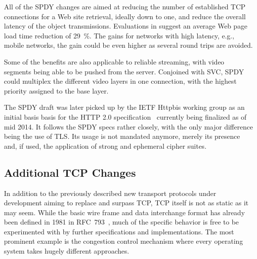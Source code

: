 All of the SPDY changes are aimed at reducing the number of established \gls{TCP} connections for a Web site retrieval, ideally down to one, and reduce the overall latency of the object transmissions. Evaluations in \cite{google2010SPDYwp} suggest an average Web page load time reduction of \SI{29}{\percent}. The gains for networks with high latency, e.g., mobile networks, the gain could be even higher as several round trips are avoided.

Some of the benefits are also applicable to reliable streaming, with video segments being able to be pushed from the server. Conjoined with \gls{SVC}, SPDY could multiplex the different video layers in one connection, with the highest priority assigned to the base layer.

The SPDY draft was later picked up by the \gls{IETF} Httpbis working group as an initial basis basis for the \gls{HTTP} 2.0 specification~\cite{http20draft} currently being finalized as of mid 2014. It follows the SPDY specs rather closely, with the only major difference being the use of \gls{TLS}. Its usage is not mandated anymore, merely its presence and, if used, the application of strong and ephemeral cipher suites.



\subsection{Additional TCP Changes}

In addition to the previously described new transport protocols under development aiming to replace and surpass \gls{TCP}, \gls{TCP} itself is not as static as it may seem. While the basic wire frame and data interchange format has already been defined in 1981 in RFC~793~\cite{rfc793}, much of the specific behavior is free to be experimented with by further specifications and implementations. The most prominent example is the congestion control mechanism where every operating system takes hugely different approaches.


